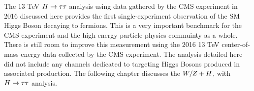 The 13 TeV $H\to\tau\tau$ analysis using data gathered by the CMS experiment in 2016 discussed here provides the first 
single-experiment observation of the SM Higgs Boson decaying to fermions. This is a very important benchmark for the CMS
experiment and the high energy particle physics commuinty as a whole. There is still room to improve this
measurement using the 2016 13 TeV center-of-mass energy data collected by the CMS experiment. The analysis
detailed here did not include any channels dedicated to targeting Higgs Bosons produced in associated production.
The following chapter discusses the $W/Z+H$, with $H\to\tau\tau$ analysis.


